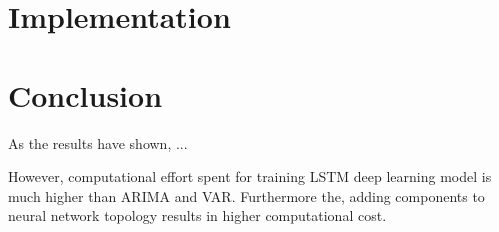 \documentclass[11pt]{article}
\begin{document}
\section{Implementation}

\section{Conclusion}
As the results have shown, ...

However, computational effort spent for training LSTM deep learning model is
much higher than ARIMA and VAR. Furthermore the, adding components to neural network
topology results in higher computational cost. 

\pagebreak


\end{document}
